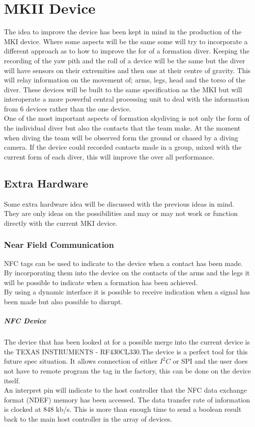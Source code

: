 \documentclass{report}
\begin{document}
  
\section{MKII Device}

The idea to improve the device has been kept in mind in the production of the MKI device. Where some aspects will be the same some will try to incorporate a different approach as to how to improve the for of a formation diver. Keeping the recording of the yaw pith and the roll of a device will be the same but the diver will have sensors on their extremities and then one at their centre of gravity. This will relay information on the movement of; arms, legs, head and the torso of the diver. These devices will be built to the same specification as the MKI but will interoperate a more powerful central processing unit to deal with the information from 6 devices rather than the one device.\\
One of the most important aspects of formation skydiving is not only the form of the individual diver but also the contacts that the team make. At the moment when diving the team will be observed form the ground or chased by a diving camera. If the device could recorded contacts made in a group, mixed with the current form of each diver, this will improve the over all performance.\\

\subsection{Extra Hardware}

Some extra hardware idea will be discussed with the previous ideas in mind. They are only ideas on the possibilities and may or may not work or function directly with the current MKI device.

\subsubsection{Near Field Communication}
NFC tags can be used to indicate to the device when a contact has been made. By incorporating them into the device on the contacts of the arms and the legs it will be possible to indicate when a formation has been achieved.\\
By using a dynamic interface it is possible to receive indication when a signal has been made but also possible to disrupt. 
\subparagraph{NFC Device}
The device that has been looked at for a possible merge into the current device is the TEXAS INSTRUMENTS - RF430CL330.The device is a perfect tool for this future spec situation. It allows connection of either $I^2C$  or SPI and the user does not have to remote program the tag in the factory, this can be done on the device itself.\\
An interpret pin will indicate to the host controller that the NFC data exchange format (NDEF) memory has been accessed. The data transfer rate of information is clocked at 848 kb/s. This is more than enough time to send a boolean result back to the main host controller in the array of devices. 
\end{document}
